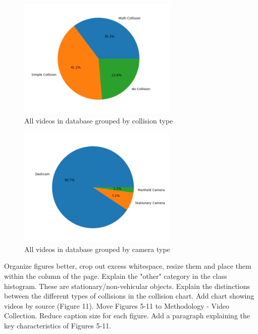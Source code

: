 \documentclass[letterpaper, 10 pt, conference]{ieeeconf}
\newcommand{\todo}[1]{{\color{red}#1}}
\begin{document}
\begin{figure}[htpb]
		\centering
    \includegraphics[width=3in]{by-collision.png}
		\caption{All videos in database grouped by collision type}
		\label{fig:vids-by-collision}
\end{figure}

\begin{figure}[htpb]
		\centering
    \includegraphics[width=3in]{by-camera.png}
		\caption{All videos in database grouped by camera type}
		\label{fig:vids-by-camera}
\end{figure}

\todo{Organize figures better, crop out excess whitespace, resize them and place them within the column of the page.}
\todo{Explain the "other" category in the class histogram. These are stationary/non-vehicular objects.}
\todo{Explain the distinctions between the different types of collisions in the collision chart.}
\todo{Add chart showing videos by source (Figure 11).}
\todo{Move Figures 5-11 to Methodology - Video Collection.}
\todo{Reduce caption size for each figure.}
\todo{Add a paragraph explaining the key characteristics of Figures 5-11.}


\end{document}
